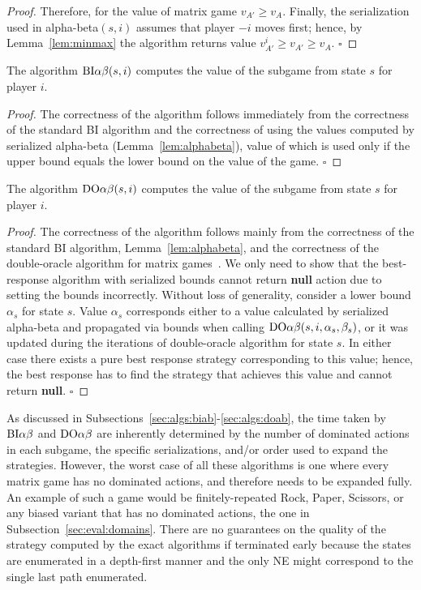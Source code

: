 {\begin{proof}
Therefore, for the value of matrix game $v_{A'} \geq v_A$. 
Finally, the serialization used in alpha-beta$(s, i)$ assumes that player $-i$ moves first; hence, by Lemma~\ref{lem:minmax} the algorithm returns value $v^i_{A'} \geq v_{A'} \geq v_{A}$. $\square$
\end{proof}
\begin{theorem}
The algorithm $\textrm{BI}\alpha\beta(s,i)$ computes the value of the subgame from state $s$ for player $i$.
\end{theorem}
\begin{proof}
The correctness of the algorithm follows immediately from the correctness of the standard BI algorithm and the correctness of using the values computed by serialized alpha-beta (Lemma~\ref{lem:alphabeta}), value of which is used only if the upper bound equals the lower bound on the value of the game. $\square$
\end{proof}
\begin{theorem}
The algorithm $\textrm{DO}\alpha\beta(s,i)$ computes the value of the subgame from state $s$ for player $i$.
\end{theorem}
\begin{proof}
The correctness of the algorithm follows mainly from the correctness of the standard BI algorithm, Lemma~\ref{lem:alphabeta}, and the correctness of the double-oracle algorithm for matrix games~\cite{McMahan03Planning}. 
We only need to show that the best-response algorithm with serialized bounds cannot return \textbf{null} action due to setting the bounds incorrectly. 
Without loss of generality, consider a lower bound $\alpha_s$ for state $s$.
Value $\alpha_s$ corresponds either to a value calculated by serialized alpha-beta and propagated via bounds when calling $\textrm{DO}\alpha\beta(s,i,\alpha_s,\beta_s)$, or it was updated during the iterations of double-oracle algorithm for state $s$. 
In either case there exists a pure best response strategy corresponding to this value; hence, the best response has to find the strategy that achieves this value and cannot return \textbf{null}. $\square$
\end{proof}

As discussed in Subsections~\ref{sec:algs:biab}-\ref{sec:algs:doab}, the time taken by $\textrm{BI}\alpha\beta$ and $\textrm{DO}\alpha\beta$
are inherently determined by the number of dominated actions in each subgame, the specific serializations, and/or order used to expand the
strategies. However, the worst case of all these algorithms is one where every matrix game has no dominated actions, and therefore needs to be expanded fully.
An example of such a game would be finitely-repeated Rock, Paper, Scissors, or any biased variant that has no dominated actions, \eg the one
in Subsection~\ref{sec:eval:domains}.
There are no guarantees on the quality of the strategy computed by the exact algorithms if terminated early because the states are enumerated in a depth-first manner
and the only NE might correspond to the single last path enumerated.

}
